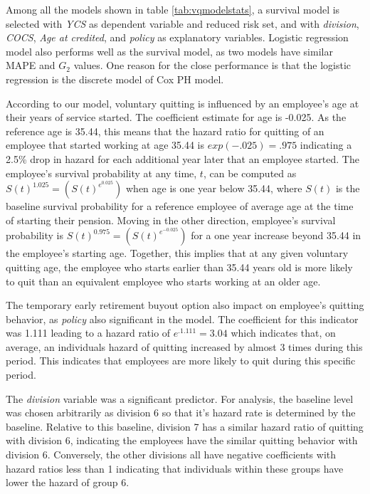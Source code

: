 \documentclass[12pt,letterpaper]{article}
\begin{document}
Among all the models shown in table \ref{tab:vqmodelstats}, a survival model is selected with {\it YCS} as dependent variable and reduced risk set, and with {\it division}, {\it COCS}, {\it Age at credited}, and {\it policy} as explanatory variables. Logistic regression model also performs well as the survival model, as two models have similar MAPE and $G_2$ values. One reason for the close performance is that the logistic regression is the discrete model of Cox PH model.


According to our model, voluntary quitting is influenced by an employee's age at their years of service started. The coefficient estimate for age is -0.025. As the reference age is 35.44, this means that the hazard ratio for quitting of an employee that started working at age 35.44 is $exp(-.025)=.975$ indicating a 2.5\% drop in hazard for each additional year later that an employee started. The employee's survival probability at any time, $t$, can be computed as $S(t)^{1.025} = (S(t)^{e^{0.025}})$ when age is one year below 35.44,  where $S(t)$ is the baseline survival probability for a reference employee of average age at the time of starting their pension. Moving in the other direction, employee's survival probability is $S(t)^{0.975}=(S(t)^{e^{-0.025}})$ for a one year increase beyond 35.44 in the employee's starting age. Together, this implies that at any given voluntary quitting age, the employee who starts earlier than 35.44 years old is more likely to quit than an equivalent employee who starts working at an older age.

The temporary early retirement buyout option also impact on employee's quitting behavior, as {\it policy} also significant in the model.  The coefficient for this indicator was 1.111 leading to a hazard ratio of $e^{.1.111} = 3.04$ which indicates that, on average, an individuals hazard of quitting increased by almost 3 times during this period. This indicates that employees are more likely to quit during this specific period.

The {\it division} variable was a significant predictor.  For analysis, the baseline level was chosen arbitrarily as division 6 so that it's hazard rate is determined by the baseline.  Relative to this baseline, division 7 has a similar hazard ratio of quitting with division 6, indicating the employees have the similar quitting behavior with division 6. Conversely, the other divisions all have negative coefficients with hazard ratios less than 1 indicating that individuals within these groups have lower the hazard of group 6.
\end{document}
